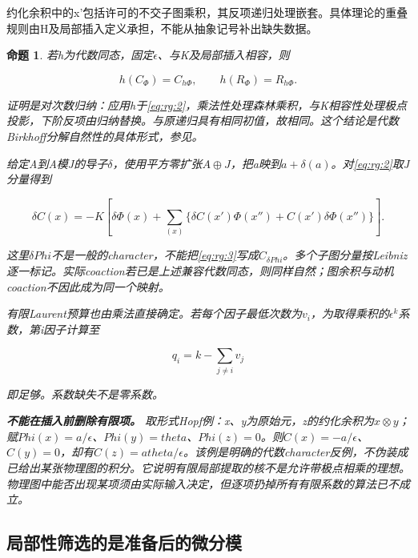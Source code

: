 \documentclass[11pt,a4paper,oneside]{ctexart}
\theoremstyle{cnplain}
\newtheorem{proposition}[theorem]{命题}
\theoremstyle{definition}
\theoremstyle{remark}
\numberwithin{equation}{section}
\begin{document}
约化余积中的x'包括许可的不交子图乘积，其反项递归处理嵌套。具体理论的重叠规则由H及局部插入定义承担，不能从抽象记号补出缺失数据。

\begin{proposition}

\label{thm:rg:2.1} 若h为代数同态，固定\(\epsilon\)、与K及局部插入相容，则

\begin{equation}
h(C_\Phi)=C_{h\Phi},\qquad h(R_\Phi)=R_{h\Phi}.
\end{equation}

证明是对次数归纳：应用h于\eqref{eq:rg:2}，乘法性处理森林乘积，与K相容性处理极点投影，下阶反项由归纳替换。与原递归具有相同初值，故相同。这个结论是代数Birkhoff分解自然性的具体形式，参见\cite[Theorem3.2]{guozhang}。

给定A到A模J的导子\(\delta\)，使用平方零扩张\(A\oplus J\)，把a映到\(a+\delta (a)\)。对\eqref{eq:rg:2}取J分量得到

\begin{equation}
\delta C(x)=-K\left[\delta\Phi(x)+
 \sum_{(x)}\{\delta C(x')\Phi(x'')+
                 C(x')\delta\Phi(x'')\}\right].    \label{eq:rg:3}
\end{equation}

这里\(\delta  Phi\)不是一般的character，不能把\eqref{eq:rg:3}写成\(C_{\delta  Phi}\)。多个子图分量按Leibniz逐一标记。实际coaction若已是上述兼容代数同态，则同样自然；图余积与动机coaction不因此成为同一个映射。

有限Laurent预算也由乘法直接确定。若每个因子最低次数为\(v_i\)，为取得乘积的\(\epsilon ^k\)系数，第i因子计算至

\begin{equation}
q_i=k-\sum_{j\ne i}v_j                            \label{eq:rg:4}
\end{equation}

即足够。系数缺失不是零系数。

\textbf{不能在插入前删除有限项。} 取形式Hopf例：x、y为原始元，z的约化余积为\(x\otimes y\)；赋\(Phi(x)=a/\epsilon\)、\(Phi(y)=theta\)、\(Phi(z)=0\)。则\(C(x)=-a/\epsilon\)、\(C(y)=0\)，却有\(C(z)=a theta/\epsilon\)。该例是明确的代数character反例，不伪装成已给出某张物理图的积分。它说明有限局部提取的核不是允许带极点相乘的理想。物理图中能否出现某项须由实际输入决定，但逐项扔掉所有有限系数的算法已不成立。

\end{proposition}


\subsection{局部性筛选的是准备后的微分模}\label{sec:rg:3}
\end{document}
